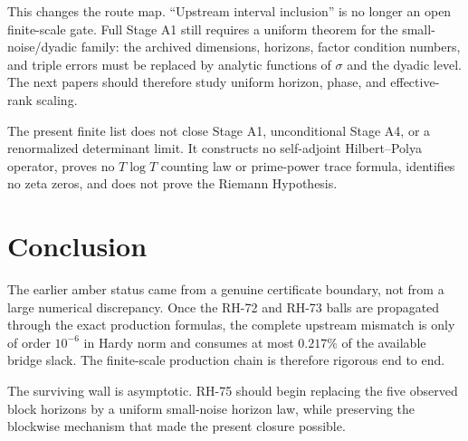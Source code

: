 \documentclass[11pt]{article}
\theoremstyle{definition}
\begin{document}
This changes the route map.  ``Upstream interval inclusion'' is no longer an
open finite-scale gate.  Full Stage A1 still requires a uniform theorem for
the small-noise/dyadic family: the archived dimensions, horizons, factor
condition numbers, and triple errors must be replaced by analytic functions
of $\sigma$ and the dyadic level.  The next papers should therefore study
uniform horizon, phase, and effective-rank scaling.

The present finite list does not close Stage A1, unconditional Stage A4, or a
renormalized determinant limit.  It constructs no self-adjoint
Hilbert--Polya operator, proves no $T\log T$ counting law or prime-power trace
formula, identifies no zeta zeros, and does not prove the Riemann Hypothesis.

\section{Conclusion}

The earlier amber status came from a genuine certificate boundary, not from a
large numerical discrepancy.  Once the RH-72 and RH-73 balls are propagated
through the exact production formulas, the complete upstream mismatch is only
of order $10^{-6}$ in Hardy norm and consumes at most $0.217\%$ of the
available bridge slack.  The finite-scale production chain is therefore
rigorous end to end.

The surviving wall is asymptotic.  RH-75 should begin replacing the five
observed block horizons by a uniform small-noise horizon law, while preserving
the blockwise mechanism that made the present closure possible.



\end{document}
